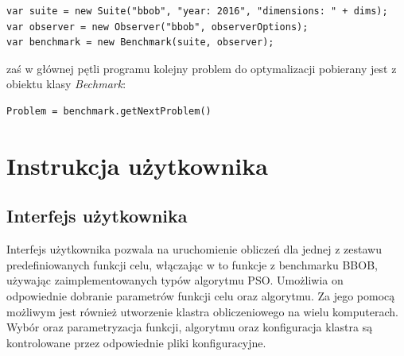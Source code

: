 \documentclass[12pt, twoside, openany, abstract=on]{report}
\theoremstyle{definition}
\begin{document}
\begin{lstlisting}[frame=single]
var suite = new Suite("bbob", "year: 2016", "dimensions: " + dims);
var observer = new Observer("bbob", observerOptions);
var benchmark = new Benchmark(suite, observer);
\end{lstlisting}

zaś w głównej pętli programu kolejny problem do optymalizacji pobierany jest z obiektu klasy \textit{Bechmark}:

\begin{lstlisting}[frame=single]
Problem = benchmark.getNextProblem()
\end{lstlisting}


\chapter{Instrukcja użytkownika}

\section{Interfejs użytkownika}
Interfejs użytkownika pozwala na uruchomienie obliczeń dla jednej z zestawu predefiniowanych funkcji celu, włączając w to funkcje z benchmarku BBOB, używając zaimplementowanych typów algorytmu PSO. Umożliwia on odpowiednie dobranie parametrów funkcji celu oraz algorytmu. Za jego pomocą możliwym jest również utworzenie klastra obliczeniowego na wielu komputerach. Wybór oraz parametryzacja funkcji, algorytmu oraz konfiguracja klastra są kontrolowane przez odpowiednie pliki konfiguracyjne. 
\end{document}
